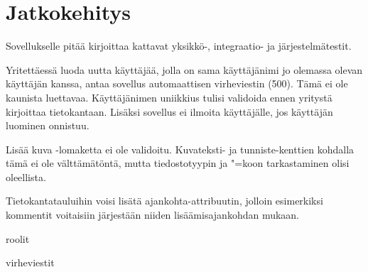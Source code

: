 \documentclass[finnish,colorlinks,headings=normal,parskip=half,footsepline]{scrartcl}
\begin{document}
\section{Jatkokehitys}
Sovellukselle pitää kirjoittaa kattavat yksikkö-, integraatio- ja järjestelmätestit.

Yritettäessä luoda uutta käyttäjää, jolla on sama käyttäjänimi jo olemassa olevan käyttäjän kanssa, antaa sovellus automaattisen virheviestin (500). Tämä ei ole kaunista luettavaa. Käyttäjänimen uniikkius tulisi validoida ennen yritystä kirjoittaa tietokantaan. Lisäksi sovellus ei ilmoita käyttäjälle, jos käyttäjän luominen onnistuu.

Lisää kuva -lomaketta ei ole validoitu. Kuvateksti- ja tunniste-kenttien kohdalla tämä ei ole välttämätöntä, mutta tiedostotyypin ja "=koon tarkastaminen olisi oleellista.

Tietokantatauluihin voisi lisätä ajankohta-attribuutin, jolloin esimerkiksi kommentit voitaisiin järjestään niiden lisäämisajankohdan mukaan.

roolit

virheviestit
\end{document}
